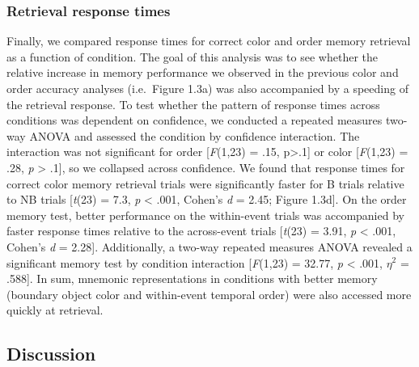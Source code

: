 \subsubsection{Retrieval response times}\label{retrieval-response-times}

Finally, we compared response times for correct color and order memory
retrieval as a function of condition. The goal of this analysis was to
see whether the relative increase in memory performance we observed in
the previous color and order accuracy analyses (i.e.~Figure 1.3a) was
also accompanied by a speeding of the retrieval response. To test
whether the pattern of response times across conditions was dependent on
confidence, we conducted a repeated measures two-way ANOVA and assessed
the condition by confidence interaction. The interaction was not
significant for order {[}\emph{F}(1,23) = .15, p\textgreater{}.1{]} or
color {[}\emph{F}(1,23) = .28, \emph{p} \textgreater{} .1{]}, so we
collapsed across confidence. We found that response times for correct
color memory retrieval trials were significantly faster for B trials
relative to NB trials {[}\emph{t}(23) = 7.3, \emph{p} \textless{} .001,
Cohen's \emph{d} = 2.45; Figure 1.3d{]}. On the order memory test,
better performance on the within-event trials was accompanied by faster
response times relative to the across-event trials {[}\emph{t}(23) =
3.91, \emph{p} \textless{} .001, Cohen's \emph{d} = 2.28{]}.
Additionally, a two-way repeated measures ANOVA revealed a significant
memory test by condition interaction {[}\emph{F}(1,23) = 32.77, \emph{p}
\textless{} .001, \(\eta^{2}\) = .588{]}. In sum, mnemonic
representations in conditions with better memory (boundary object color
and within-event temporal order) were also accessed more quickly at
retrieval.

\subsection{Discussion}\label{discussion-1}

